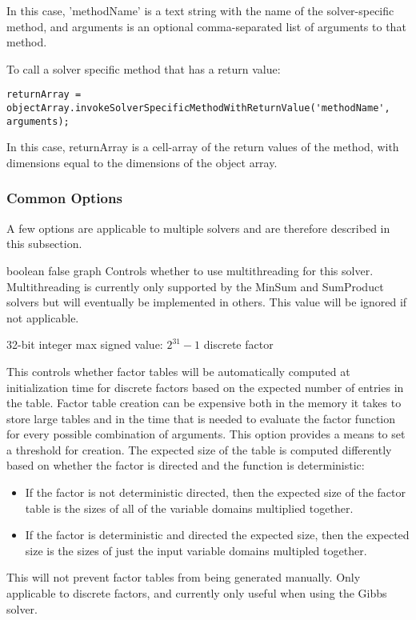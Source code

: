 In this case, 'methodName' is a text string with the name of the solver-specific method, and arguments is an optional comma-separated list of arguments to that method.

To call a solver specific method that has a return value:
\begin{lstlisting}
returnArray = objectArray.invokeSolverSpecificMethodWithReturnValue('methodName', arguments);
\end{lstlisting}

In this case, returnArray is a cell-array of the return values of the method, with dimensions equal to the dimensions of the object array.

\fi

\subsubsection{Common Options}

A few options are applicable to multiple solvers and are therefore described in this subsection.


{boolean}
{false}
{graph}
{Controls whether to use multithreading for this solver. Multithreading is currently only supported by the MinSum and SumProduct solvers but will eventually be implemented in others. This value will be ignored if not applicable.}


{32-bit integer}
{max signed value: $2^{31} - 1$}
{discrete factor}
{This controls whether factor tables will be automatically computed at initialization time for discrete factors based on the expected number of entries in the table. Factor table creation can be expensive both in the memory it takes to store large tables and in the time that is needed to evaluate the factor function for every possible combination of arguments. This option provides a means to set a threshold for creation.
\linebreak
\linebreak
The expected size of the table is computed differently based on whether the factor is directed and the function is deterministic:
\begin{itemize}
\item If the factor is not deterministic directed, then the expected size of the factor table is the sizes of all of the variable domains multiplied together.
\item If the factor is deterministic and directed the expected size, then the expected size is the sizes of just the input variable domains multipled together.
\end{itemize}

This will not prevent factor tables from being generated manually. Only applicable to discrete factors, and currently only useful when using the Gibbs solver.}

